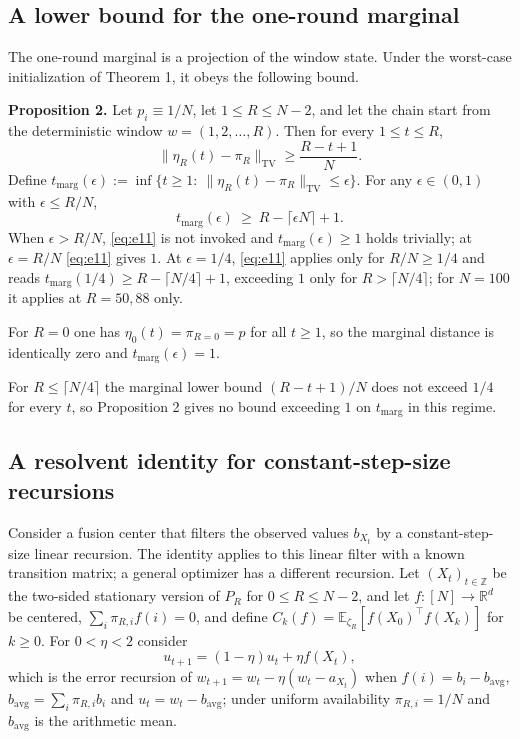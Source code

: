\documentclass[twoside,11pt]{article}
\begin{document}
\subsection{A lower bound for the one-round marginal}
The one-round marginal is a projection of the window state. Under the worst-case initialization of Theorem 1, it obeys the following bound.

\textbf{Proposition 2.} Let $p_i\equiv1/N$, let $1\leq R\leq N-2$, and let the chain start from the deterministic window $w=(1,2,\dots,R)$. Then for every $1\leq t\leq R$,
\begin{equation}\label{eq:e10}
\|\eta_R(t)-\pi_R\|_{\mathrm{TV}}\geq\dfrac{R-t+1}{N}.
\end{equation}
Define $t_{\mathrm{marg}}(\epsilon):=\inf\{t\geq1:\ \|\eta_R(t)-\pi_R\|_{\mathrm{TV}}\leq\epsilon\}$. For any $\epsilon\in(0,1)$ with $\epsilon\leq R/N$,
\begin{equation}\label{eq:e11}
t_{\mathrm{marg}}(\epsilon)\ \geq\ R-\lceil\epsilon N\rceil+1.
\end{equation}
When $\epsilon>R/N$, \eqref{eq:e11} is not invoked and $t_{\mathrm{marg}}(\epsilon)\geq1$ holds trivially; at $\epsilon=R/N$ \eqref{eq:e11} gives $1$. At $\epsilon=1/4$, \eqref{eq:e11} applies only for $R/N\geq1/4$ and reads $t_{\mathrm{marg}}(1/4)\geq R-\lceil N/4\rceil+1$, exceeding $1$ only for $R>\lceil N/4\rceil$; for $N=100$ it applies at $R=50,88$ only.

For $R=0$ one has $\eta_0(t)=\pi_{R=0}=p$ for all $t\geq1$, so the marginal distance is identically zero and $t_{\mathrm{marg}}(\epsilon)=1$.

For $R\leq\lceil N/4\rceil$ the marginal lower bound $(R-t+1)/N$ does not exceed $1/4$ for every $t$, so Proposition 2 gives no bound exceeding $1$ on $t_{\mathrm{marg}}$ in this regime.

\subsection{A resolvent identity for constant-step-size recursions}
Consider a fusion center that filters the observed values $b_{X_t}$ by a constant-step-size linear recursion. The identity applies to this linear filter with a known transition matrix; a general optimizer has a different recursion. Let $(X_t)_{t\in\mathbb{Z}}$ be the two-sided stationary version of $P_R$ for $0\leq R\leq N-2$, and let $f:[N]\to\mathbb{R}^{d}$ be centered, $\sum_i\pi_{R,i}f(i)=0$, and define $C_k(f)=\mathbb{E}_{\zeta_R}[f(X_0)^{\top}f(X_k)]$ for $k\geq0$. For $0<\eta<2$ consider
\begin{equation}\label{eq:e12}
u_{t+1}=(1-\eta)u_t+\eta f(X_t),
\end{equation}
which is the error recursion of $w_{t+1}=w_t-\eta(w_t-a_{X_t})$ when $f(i)=b_i-b_{\mathrm{avg}}$, $b_{\mathrm{avg}}=\sum_i\pi_{R,i}b_i$ and $u_t=w_t-b_{\mathrm{avg}}$; under uniform availability $\pi_{R,i}=1/N$ and $b_{\mathrm{avg}}$ is the arithmetic mean.
\end{document}
